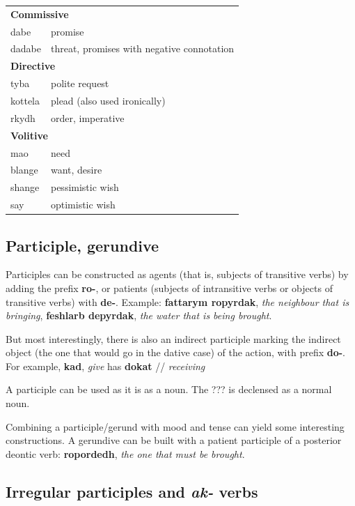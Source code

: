 \documentclass[10pt,oneside]{memoir}
\newcommand{\ipa}[1]{/\textipa{#1}/}
\begin{document}
\begin{multicols}{2}
    \begin{tabular}[]{l | l}
        \multicolumn{2}{l}{\bfseries Commissive}\\
        dabe & promise\\
        dadabe & threat, promises with negative connotation\\
        \multicolumn{2}{l}{\bfseries Directive}\\
        tyba & polite request\\
        kottela & plead (also used ironically)\\
        rkydh & order, imperative\\
        \multicolumn{2}{l}{\bfseries Volitive}\\
        mao & need\\
        blange & want, desire\\
        shange & pessimistic wish\\
        say & optimistic wish
    \end{tabular}
    
    \subsection{Participle, gerundive}
	Participles can be constructed as agents (that is, subjects of transitive verbs) by adding the prefix \textbf{ro-}, or patients (subjects of intransitive verbs or objects of transitive verbs) with \textbf{de-}. Example: \textbf{fattarym ropyrdak}, \emph{the neighbour that is bringing}, \textbf{feshlarb depyrdak}, \emph{the water that is being brought}.

    But most interestingly, there is also an indirect participle marking the indirect object (the one that would go in the dative case) of the action, with prefix \textbf{do-}. For example, \textbf{kad}, \emph{give} has \textbf{dokat} \ipa{do'kad} \emph{receiving}

		A participle can be used as it is as a noun. The ??? is declensed as a normal noun.

		Combining a participle/gerund with mood and tense can yield some interesting constructions. A gerundive can be built with a patient participle of a posterior deontic verb: \textbf{ropordedh}, \emph{the one that must be brought}.


\subsection{Irregular participles and \emph{ak-} verbs}


\end{multicols}
\end{document}
